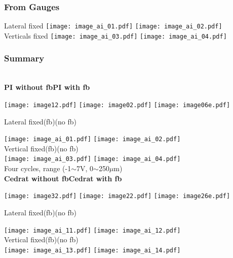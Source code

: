 \subsubsection{From Gauges}
Lateral fixed
 \texttt{[image: image\_ai\_01.pdf]}
 \texttt{[image: image\_ai\_02.pdf]}\\
Verticals fixed
 \texttt{[image: image\_ai\_03.pdf]}
 \texttt{[image: image\_ai\_04.pdf]}\\ 

 
 \subsubsection{Summary}
 \\
\textbf{PI without fb}\hspace*{4cm}\textbf{PI with  fb}\par
\texttt{[image: image12.pdf]}\hspace*{2cm}
\texttt{[image: image02.pdf]}
\texttt{[image: image06e.pdf]}\par
Lateral fixed\hspace{1.8cm}(fb)\hspace{3.0cm}(no fb)\par
 \hspace*{2cm}\texttt{[image: image\_ai\_01.pdf]}
 \texttt{[image: image\_ai\_02.pdf]}\\
 Vertical fixed\hspace{1.6cm}(fb)\hspace{3.0cm}(no fb)\\
 \hspace*{2cm}\texttt{[image: image\_ai\_03.pdf]}
 \texttt{[image: image\_ai\_04.pdf]}\\
{\tiny Four cycles, range (-1$\sim$7V, 0$\sim$250$\mu$m)}\\
\textbf{Cedrat without fb}\hspace*{3.2cm}\textbf{Cedrat with  fb}\par
\texttt{[image: image32.pdf]}\hspace*{2cm}
\texttt{[image: image22.pdf]}
\texttt{[image: image26e.pdf]}\par
Lateral fixed\hspace{1.8cm}(fb)\hspace{3.0cm}(no fb)\par
 \hspace*{2cm}\texttt{[image: image\_ai\_11.pdf]}
 \texttt{[image: image\_ai\_12.pdf]}\\
 Vertical fixed\hspace{1.6cm}(fb)\hspace{3.0cm}(no fb)\\
  \hspace*{2cm}\texttt{[image: image\_ai\_13.pdf]}
 \texttt{[image: image\_ai\_14.pdf]}\\ 



